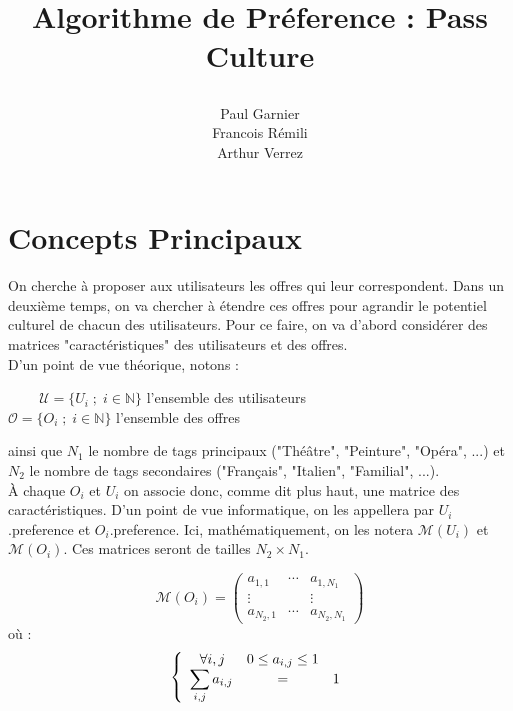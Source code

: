 \documentclass[11pt, oneside]{article}
\title{\begin{center} Algorithme de Préference : Pass Culture \end{center}}
\author{Paul Garnier \\ Francois Rémili \\ Arthur Verrez}
\begin{document}
\maketitle


\pagestyle{empty}

\maketitle





\pagestyle{plain}

\section{Concepts Principaux}

On cherche à proposer aux utilisateurs les offres qui leur correspondent. Dans un deuxième temps, on va chercher à étendre ces offres pour agrandir le potentiel culturel de chacun des utilisateurs. Pour ce faire, on va d'abord considérer des matrices "caractéristiques" des utilisateurs et des offres. \\

D'un point de vue théorique, notons :

\begin{center}

 $\;\;\;\;\;\;\;\;\mathcal{U} = \{U_i \; ; \; i \in \mathbb{N} \}$ l'ensemble des utilisateurs \\
$\mathcal{O} = \{O_i \; ; \; i \in \mathbb{N} \}$ l'ensemble des offres \\

\end{center}

ainsi que $N_1$ le nombre de tags principaux ("Théâtre", "Peinture", "Opéra", ...) et $N_2$ le nombre de tags secondaires ("Français", "Italien", "Familial", ...). \\

À chaque $O_i$ et $U_i$ on associe donc, comme dit plus haut, une matrice des caractéristiques. D'un point de vue informatique, on les appellera par $U_i$.preference et $O_i$.preference. Ici, mathématiquement, on les notera $\mathcal{M} (U_i)$ et $\mathcal{M} (O_i)$. Ces matrices seront de tailles $N_2 \times N_1$.

\begin{center}
\[
\mathcal{M} (O_i) =
\begin{pmatrix}
a_{1,1} & \cdots & a_{1,N_1} \\
\vdots & & \vdots \\
a_{N_2,1} & \cdots & a_{N_2,N_1}
\end{pmatrix}
\]
où :
\[
 \left \{
   \begin{array}{r c l}
      \forall i,j \; \; & 0 \leq a_{i,j} \leq 1 \\
      \displaystyle \sum_{i,j} a_{i,j} &=& 1 \\
   \end{array}
   \right .
\]
\end{center}
\end{document}
